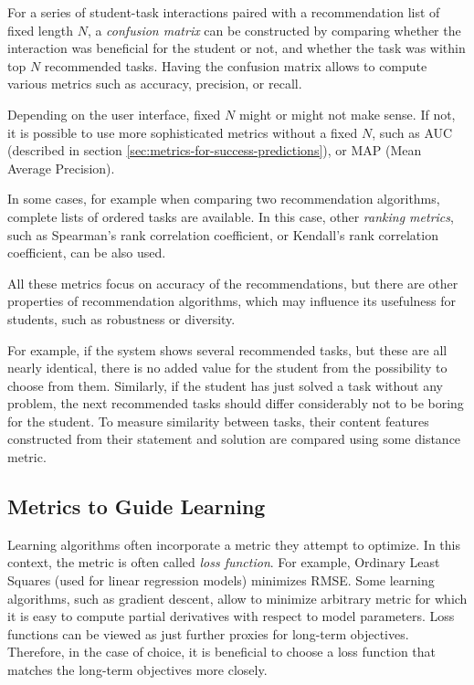For a series of student-task interactions paired with a recommendation list of
fixed length $N$, a \emph{confusion matrix} can be constructed by comparing
whether the interaction was beneficial for the student or not,
and whether the task was within top $N$ recommended tasks.
Having the confusion matrix allows to compute various metrics such as
accuracy, precision, or recall. %

Depending on the user interface, fixed $N$ might or might not make sense.
If not, it is possible to use more sophisticated metrics without a fixed $N$,
such as AUC (described in section \ref{sec:metrics-for-success-predictions}),
or MAP (Mean Average Precision).

In some cases, for example when comparing two recommendation algorithms,
complete lists of ordered tasks are available.
In this case, other \emph{ranking metrics},
  such as Spearman's rank correlation coefficient,
  or Kendall's rank correlation coefficient,
  can be also used.

All these metrics focus on accuracy of the recommendations,
but there are other properties of recommendation algorithms,
which may influence its usefulness for students,
such as robustness or diversity.

For example, if the system shows several recommended tasks,
but these are all nearly identical, there is no added value
for the student from the possibility to choose from them.
Similarly, if the student has just solved a task
without any problem, the next recommended tasks should
differ considerably not to be boring for the student.
To measure similarity between tasks, their content features
constructed from their statement and solution are compared
using some distance metric.


\subsection{Metrics to Guide Learning}
\label{sec:metrics-to-guide-learning}

Learning algorithms often incorporate a metric they attempt to optimize.
In this context, the metric is often called \emph{loss function}.
For example,
  Ordinary Least Squares (used for linear regression models) minimizes RMSE.
Some learning algorithms, such as gradient descent,
  allow to minimize arbitrary metric
  for which it is easy to compute partial derivatives with respect to model parameters.
Loss functions can be viewed as just further proxies for long-term objectives.
Therefore, in the case of choice, it is beneficial to choose a loss function
  that matches the long-term objectives more closely.

